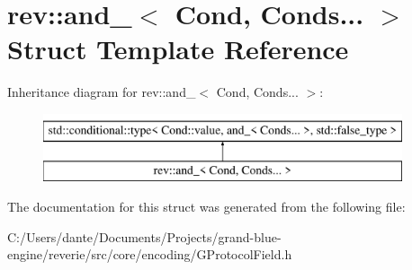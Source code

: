 \hypertarget{structrev_1_1and___3_01_cond_00_01_conds_8_8_8_01_4}{}\section{rev\+::and\+\_\+$<$ Cond, Conds... $>$ Struct Template Reference}
\label{structrev_1_1and___3_01_cond_00_01_conds_8_8_8_01_4}
Inheritance diagram for rev\+::and\+\_\+$<$ Cond, Conds... $>$\+:\begin{figure}[H]
\begin{center}
\leavevmode
\includegraphics[height=2.000000cm]{structrev_1_1and___3_01_cond_00_01_conds_8_8_8_01_4}
\end{center}
\end{figure}


The documentation for this struct was generated from the following file\+:\begin{DoxyCompactItemize}
\item 
C\+:/\+Users/dante/\+Documents/\+Projects/grand-\/blue-\/engine/reverie/src/core/encoding/G\+Protocol\+Field.\+h\end{DoxyCompactItemize}
